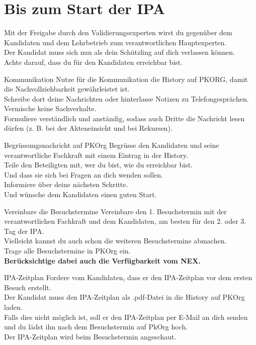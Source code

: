 \section{Bis zum Start der IPA}
Mit der Freigabe durch den Validierungsexperten wirst du gegenüber dem Kandidaten und dem Lehrbetrieb zum verantwortlichen Hauptexperten.\\Der Kandidat muss sich nun als dein Schützling auf dich verlassen können.\\Achte darauf, dass du für den Kandidaten erreichbar bist.

\begin{taskitemwithoutcomment}{Kommunikation}
  Nutze für die Kommunikation die History auf PKORG, damit die Nachvollziehbarkeit gewährleistet ist.\\Schreibe dort deine Nachrichten oder hinterlasse Notizen zu Telefongesprächen.\\Vermische keine Sachverhalte.\\Formuliere verständlich und anständig, sodass auch Dritte die Nachricht lesen dürfen (z. B. bei der Akteneinsicht und bei Rekursen).
\end{taskitemwithoutcomment}
\begin{taskitemwithoutcomment}{Begrüssungsnachricht auf PKOrg}
  Begrüsse den Kandidaten und seine verantwortliche Fachkraft mit einem Eintrag in der History.\\Teile den Beteiligten mit, wer du bist, wie du erreichbar bist.\\Und dass sie sich bei Fragen an dich wenden sollen.\\Informiere über deine nächsten Schritte.\\Und wünsche dem Kandidaten einen guten Start. 
\end{taskitemwithoutcomment}
\begin{taskitem}{Vereinbare die Besuchstermine}
  Vereinbare den 1. Besuchstermin mit der verantwortlichen Fachkraft und dem Kandidaten, am besten für den 2. oder 3. Tag der IPA.\\Vielleicht kannst du auch schon die weiteren Besuchstermine abmachen.\\Trage alle Besuchstermine in PKOrg ein.\\\textbf{Berücksichtige dabei auch die Verfügbarkeit vom NEX.}
\end{taskitem}
\begin{taskitemwithoutcomment}{IPA-Zeitplan}
  Fordere vom Kandidaten, dass er den IPA-Zeitplan vor dem ersten Besuch erstellt.\\Der Kandidat muss den IPA-Zeitplan als .pdf-Datei in die History auf PKOrg laden.\\Falls dies nicht möglich ist, soll er den IPA-Zeitplan per E-Mail an dich senden und du lädst ihn nach dem Besuchstermin auf PkOrg hoch.\\Der IPA-Zeitplan wird beim Besuchstermin angeschaut.
\end{taskitemwithoutcomment}

